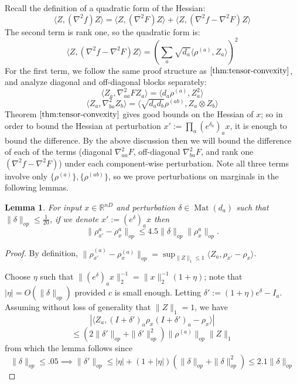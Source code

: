 \documentclass{article}
\newtheorem{lemma}[theorem]{Lemma}
\newcommand{\R}{{\mathbb{R}}}
\newcommand{\mat}{\operatorname{Mat}}
\newcommand\samp{x}
\begin{document}
Recall the definition of a quadratic form of the Hessian:
\[ \langle Z, (\nabla^{2} f) Z \rangle = \langle Z, (\nabla^{2} F) Z \rangle + \langle Z, (\nabla^{2} f - \nabla^{2} F) Z \rangle     \]
The second term is rank one, so the quadratic form is:
\[ \langle Z, (\nabla^{2} f - \nabla^{2} F) Z \rangle = \left( \sum_{a} \sqrt{d_{a}} \langle \rho^{(a)}, Z_{a} \rangle   \right)^{2}       \]
For the first term, we follow the same proof structure as $\ref{thm:tensor-convexity}$, and analyze diagonal and off-diagonal blocks separately:
\[ \langle Z_{a}, \nabla^{2}_{aa} F Z_{a} \rangle = \langle d_{a} \rho^{(a)}, Z_{a}^{2} \rangle       \]
\[ \langle Z_{a}, \nabla^{2}_{ba} Z_{b} \rangle = \langle \sqrt{d_{a} d_{b}} \rho^{(ab)}, Z_{a} \otimes Z_{b} \rangle   \]
Theorem $\ref{thm:tensor-convexity}$ gives good bounds on the Hessian of $\samp$; so in order to bound the Hessian at perturbation $\samp' := \prod_{a} (e^{\delta_{a}})_{a} \samp$, it is enough to bound the difference. By the above discussion then we will bound the difference of each of the terms (diagonal $\nabla^{2}_{aa} F$, off-diagonal $\nabla^{2}_{ba} F$, and rank one $(\nabla^{2} f - \nabla^{2} F)$) under each component-wise perturbation. Note all three terms involve only $\{\rho^{(a)}\}, \{\rho^{(ab)}\}$, so we prove perturbations on marginals in the following lemmas.  

\begin{lemma} \label{atoaaRobustness}
For input $\samp \in \R^{nD}$ and perturbation $\delta \in \mat(d_{a})$ such that $\|\delta\|_{op} \leq \frac{1}{20}$, if we denote $\samp' := (e^{\delta})_{a} \samp$ then
\[ \|\rho_{\samp'}^{a} - \rho_{\samp}^{a}\|_{op} \leq 4.5 \|\delta\|_{op} \|\rho_{\samp}^{a}\|_{op}   . \]
\end{lemma}
\begin{proof} By definition, $\|\rho_{\samp'}^{(a)} - \rho_{\samp}^{(a)}\|_{op} = \sup_{\|Z\|_{1} \leq 1} \langle Z_{a}, \rho_{\samp'} - \rho_{\samp} \rangle $. 


Choose $\eta$ such that  $\|(e^{\delta})_{a} \samp\|_{2}^{-1} = \|\samp\|_{2}^{-1} (1 + \eta)$; note that $|\eta| = O(\|\delta\|_{op})$ provided $c$ is small enough. Letting $\delta' := (1+\eta)e^{\delta} - I_{a}$. Assuming without loss of generality that $\|Z\|_{1} = 1$, we have 
\[ | \langle Z_{a}, (I+\delta')_a \rho_{\samp} (I+\delta')_a - \rho_{\samp} \rangle | \]
\[ \leq (2\|\delta'\|_{op} + \|\delta'\|_{op}^{2}) \|\rho^{(a)}\|_{op} \|Z\|_{1}    \]
from which the lemma follows since 
\[ \|\delta\|_{op} \leq .05 \implies \|\delta'\|_{op} \leq |\eta| + (1+|\eta|)(\|\delta\|_{op} + \|\delta\|_{op}^{2}) \leq  2.1 \|\delta\|_{op} \]
\end{proof}
\end{document}
